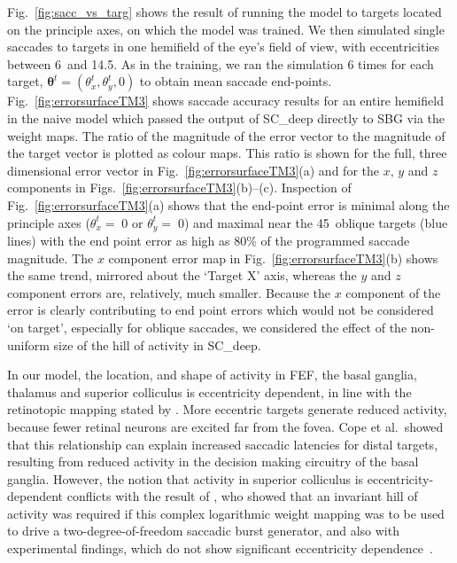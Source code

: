 \documentclass{frontiersSCNS}
\begin{document}
Fig.~\ref{fig:sacc_vs_targ} shows
the result of running the model to targets located on the principle
axes, on which the model was trained. We then simulated single saccades
to targets in one hemifield of the eye's field of view, with
eccentricities between 6\dg~and 14.5\dg. As in the
training, we ran the simulation 6 times for each target,
$\mathbf{\theta}^t = (\theta_{x}^t, \theta_{y}^t, 0)$ to obtain
mean saccade end-points.
Fig.~\ref{fig:errorsurfaceTM3} shows saccade accuracy results for an
entire hemifield in the naive model which passed the output of
SC\_deep directly to SBG via the weight maps. The ratio of
the magnitude of the error vector to the magnitude of the target
vector is plotted as colour maps. This ratio is shown for the full,
three dimensional error vector in Fig.~\ref{fig:errorsurfaceTM3}(a) and
for the $x$, $y$ and $z$ components in Figs.~\ref{fig:errorsurfaceTM3}(b)--(c).
Inspection of  Fig.~\ref{fig:errorsurfaceTM3}(a) shows that the end-point
error is minimal along the principle axes ($\theta_{x}^t=\;$0 or
$\theta_{y}^t=\;$0) and maximal near the 45\dg~oblique targets
(blue lines) with the end point error as high as 80\% of the
programmed saccade magnitude.
The $x$ component error map in Fig.~\ref{fig:errorsurfaceTM3}(b)
shows the same trend, mirrored about the `Target X' axis, whereas
the $y$ and $z$ component errors are, relatively, much smaller.
Because the $x$ component of the error is clearly contributing to
end point errors which would not be considered `on target',
especially for oblique saccades, we considered the effect of the
non-uniform size of the hill of activity in SC\_deep.

In our model, the location,  and shape of activity in FEF,
the basal ganglia, thalamus and superior colliculus is eccentricity
dependent, in line with the retinotopic mapping stated by
\cite{ottes_visuomotor_1986}. More eccentric targets generate reduced
activity, because fewer retinal neurons are excited far from the
fovea. Cope et al.~showed that this relationship can explain
increased saccadic latencies for distal targets, resulting from
reduced activity in the decision making circuitry of the basal ganglia.
However, the notion that activity in superior colliculus is
eccentricity-dependent conflicts with the result of
\cite{tabareau_geometry_2007}, who showed
that an invariant hill of activity was required if this complex
logarithmic weight mapping was to be used to drive a
two-degree-of-freedom saccadic burst generator, and also with
experimental findings, which do not show significant eccentricity
dependence~\cite{ref}.
\end{document}
